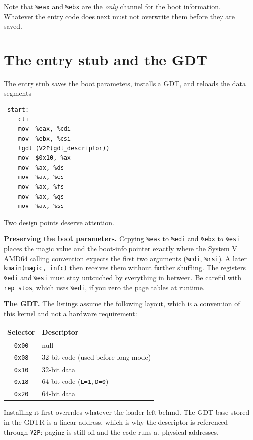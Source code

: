Note that \texttt{\%eax} and \texttt{\%ebx} are the \emph{only} channel for the boot information. Whatever the entry code does next must not overwrite them before they are saved.

\section{The entry stub and the GDT}

The entry stub saves the boot parameters, installs a GDT, and reloads the data segments:

\begin{lstlisting}[language=gas]
_start:
    cli
    mov  %eax, %edi
    mov  %ebx, %esi
    lgdt (V2P(gdt_descriptor))
    mov  $0x10, %ax
    mov  %ax, %ds
    mov  %ax, %es
    mov  %ax, %fs
    mov  %ax, %gs
    mov  %ax, %ss
\end{lstlisting}

Two design points deserve attention.

\textbf{Preserving the boot parameters.} Copying \texttt{\%eax} to \texttt{\%edi} and \texttt{\%ebx} to \texttt{\%esi} places the magic value and the boot-info pointer exactly where the System V AMD64 calling convention expects the first two arguments (\texttt{\%rdi}, \texttt{\%rsi}). A later \texttt{kmain(magic,\ info)} then receives them without further shuffling. The registers \texttt{\%edi} and \texttt{\%esi} must stay untouched by everything in between. Be careful with \texttt{rep\ stos}, which uses \texttt{\%edi}, if you zero the page tables at runtime.

\textbf{The GDT.} The listings assume the following layout, which is a convention of this kernel and not a hardware requirement:

\begin{longtable}[]{@{}cl@{}}
\toprule\noalign{}
Selector & Descriptor \\
\midrule\noalign{}
\endhead
\bottomrule\noalign{}
\endlastfoot
\texttt{0x00} & null \\
\texttt{0x08} & 32-bit code (used before long mode) \\
\texttt{0x10} & 32-bit data \\
\texttt{0x18} & 64-bit code (\texttt{L=1}, \texttt{D=0}) \\
\texttt{0x20} & 64-bit data \\
\end{longtable}

Installing it first overrides whatever the loader left behind. The GDT base stored in the GDTR is a linear address, which is why the descriptor is referenced through \texttt{V2P}: paging is still off and the code runs at physical addresses.

